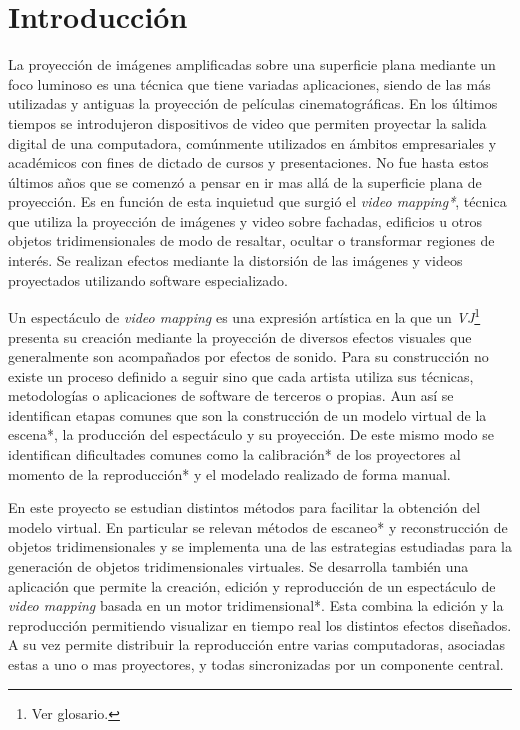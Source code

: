 ﻿\chapter{Introducción}

La proyección de imágenes amplificadas sobre una superficie plana mediante un foco luminoso es una técnica que tiene variadas aplicaciones, siendo de las más utilizadas y antiguas la proyección de películas cinematográficas. En los últimos tiempos se introdujeron dispositivos de video que permiten proyectar la salida digital de una computadora, comúnmente utilizados en ámbitos empresariales y académicos con fines de dictado de cursos y presentaciones. No fue hasta estos últimos años que se comenzó a pensar en ir mas allá de la superficie plana de proyección. Es en función de esta inquietud que surgió el \emph{video mapping*}, técnica que utiliza la proyección de imágenes y video sobre fachadas, edificios
u otros objetos tridimensionales de modo de resaltar, ocultar o transformar regiones de interés. Se realizan efectos mediante la distorsión de las imágenes y videos proyectados utilizando software especializado.

Un espectáculo de \emph{video mapping} es una expresión artística en la que un \emph{VJ}\footnote{Ver glosario.} presenta su creación mediante la proyección de diversos efectos visuales que generalmente son acompañados por efectos de sonido. Para su construcción no existe un proceso definido a seguir sino que cada artista utiliza sus técnicas, metodologías o aplicaciones de software de terceros o propias. Aun así se identifican etapas comunes que son la construcción de un modelo virtual de la escena*, la producción del espectáculo y su proyección. De este mismo modo se identifican dificultades comunes como la calibración* de los proyectores al momento de la reproducción* y el modelado realizado de forma manual.

En este proyecto se estudian distintos métodos para facilitar la obtención del modelo virtual. En particular se relevan métodos de escaneo* y reconstrucción de objetos tridimensionales y se implementa una de las estrategias estudiadas para la generación de objetos tridimensionales virtuales. %
Se desarrolla también una aplicación que permite la creación, edición y reproducción de un espectáculo de \emph{video mapping} basada en un motor tridimensional*.
Esta combina la edición y la reproducción permitiendo visualizar en tiempo real los distintos efectos diseñados. A su vez permite distribuir la reproducción
entre varias computadoras, asociadas estas a uno o mas proyectores, y todas sincronizadas por un componente central.